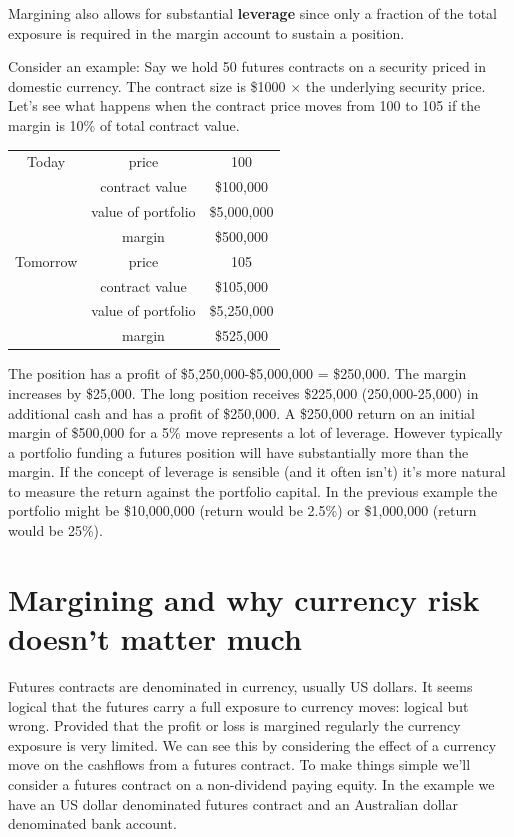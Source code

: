 Margining also allows for substantial \textbf{leverage} since only a fraction of the total exposure is required in the margin account to sustain a position. 

Consider an example: Say we hold 50 futures contracts on a security priced in domestic currency. The contract size is \$1000 $\times$ the underlying security price. Let's see what happens when the contract price moves from 100 to 105 if the margin is 10\% of total contract value.

\begin{center} \begin{tabular}{|c|c|c|}
  \hline
  Today& price & 100 \\
  & contract value & \$100,000 \\
  & value of portfolio & \$5,000,000 \\
  & margin & \$500,000 \\
   \hline
  Tomorrow & price & 105 \\
  & contract value & \$105,000 \\
  & value of portfolio & \$5,250,000 \\
  & margin & \$525,000 \\
  \hline
\end{tabular}\end{center}

The position has a profit of \$5,250,000-\$5,000,000 = \$250,000. The margin increases by \$25,000. The long position receives \$225,000 (250,000-25,000) in additional cash and has a profit of \$250,000. A \$250,000 return on an initial margin of \$500,000 for a 5\% move represents a lot of leverage. However typically a portfolio funding a futures position will have substantially more than the margin. If the concept of leverage is sensible (and it often isn't) it's more natural to measure the return against the portfolio capital. In the previous example the portfolio might be \$10,000,000 (return would be 2.5\%) or \$1,000,000 (return would be 25\%).

\section{Margining and why currency risk doesn't matter much}

Futures contracts are denominated in currency, usually US dollars. It seems logical that the futures carry a full exposure to currency moves: logical but wrong. Provided that the profit or loss is margined regularly the currency exposure is very limited. We can see this by considering the effect of a currency move on the cashflows from a futures contract. To make things simple we'll consider a futures contract on a non-dividend paying equity. In the example we have an US dollar denominated futures contract and an Australian dollar denominated bank account.

